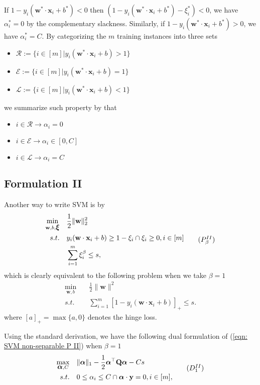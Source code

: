 \documentclass[
10pt, %
a4paper, %
oneside, %
headinclude,footinclude, %
BCOR5mm, %
]{scrartcl}
\newcommand{\QB}{\mathbf{Q}}
\newcommand{\wB}{\mathbf{w}}
\newcommand{\xB}{\mathbf{x}}
\newcommand{\yB}{\mathbf{y}}
\newcommand{\EM}{\mathcal{E}}
\newcommand{\LM}{\mathcal{L}}
\newcommand{\RM}{\mathcal{R}}
\newcommand{\xiB}{\mbox{\boldmath$\xi$\unboldmath}}
\newcommand{\alphaB}{\mbox{\boldmath$\alpha$\unboldmath}}
\begin{document}
If $1 - y_i(\wB^*\cdot\xB_i+b^*) < 0$ then $(1 - y_i(\wB^*\cdot\xB_i+b^*) - \xi^*_i) < 0$, we have $\alpha^*_i = 0$ by the complementary slackness.
Similarly, if $1 - y_i(\wB^*\cdot\xB_i+b^*) > 0$, we have $\alpha^*_i = C$.
By categorizing the $m$ training instances into three sets
\begin{itemize}
	\item $\RM := \{i\in [m] | y_i(\wB^*\cdot\xB_i+b) > 1 \}$
	\item $\EM := \{i\in [m] | y_i(\wB^*\cdot\xB_i+b) = 1 \}$
	\item $\LM := \{i\in [m] | y_i(\wB^*\cdot\xB_i+b) < 1 \}$
\end{itemize}
we summarize such property by that 
\begin{itemize}
	\item $i \in \RM \rightarrow \alpha_i = 0$
	\item $i \in \EM \rightarrow \alpha_i \in [0, C]$
	\item $i \in \LM \rightarrow \alpha_i = C$
\end{itemize}

\subsection{Formulation II}

Another way to write SVM is by 
\begin{equation}
\begin{aligned}
\min_{\wB, b, \xiB} & \quad \frac{1}{2}\|\wB\|_2^2  \\
s.t. & \quad y_i(\wB\cdot\xB_i+b)\geq 1- \xi_i \cap \xi_i \geq 0, i\in[m] \\
& \quad \sum_{i=1}^m \xi_i^\beta \leq s,
\end{aligned}
\tag{$P^{II}_\beta$}
\label{eqn: SVM non-separable P II}
\end{equation}
which is clearly equivalent to the following problem when we take $\beta  = 1$
\begin{equation}
	\begin{aligned}
		\min_{\wB, b} & \quad \frac{1}{2}\|\wB\|^2 \\
		s.t. & \quad \sum_{i=1}^m [1-y_i(\wB\cdot\xB_i+b)]_+ \leq s.
 	\end{aligned}
\end{equation}
where $[a]_+ = \max \{a, 0\}$ denotes the hinge loss.

Using the standard derivation, we have the following dual formulation of (\ref{eqn: SVM non-separable P II}) when $\beta = 1$
\begin{equation*}
	\begin{aligned}
		\max_{\alphaB, C} & \quad \|\alphaB\|_1-\frac{1}{2}\alphaB^\top\QB\alphaB - Cs\\
		s.t. & \quad 0\leq \alpha_i \leq C \cap \alphaB\cdot\yB = 0, i\in [m],
	\end{aligned}
\tag{$D^{II}_1$}
\label{eqn: SVM non-separable D II}
\end{equation*}
\end{document}
